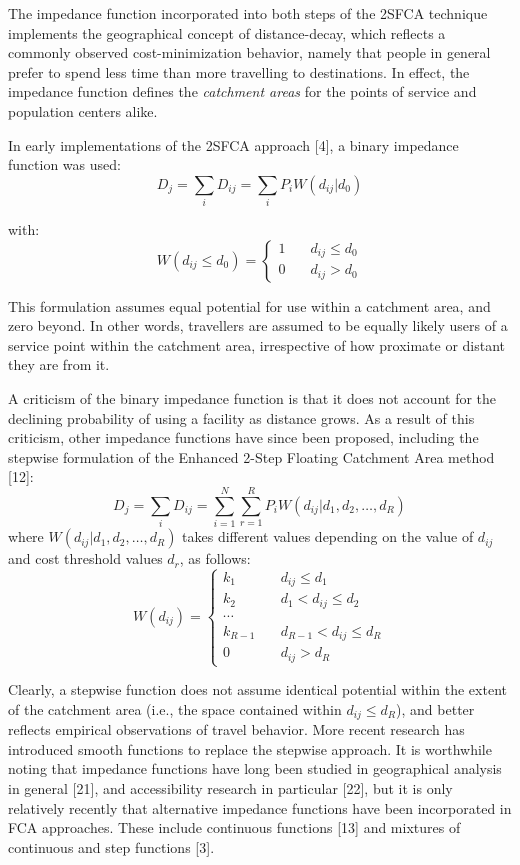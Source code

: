 \documentclass[10pt,letterpaper]{article}
\begin{document}
The impedance function incorporated into both steps of the 2SFCA
technique implements the geographical concept of distance-decay, which
reflects a commonly observed cost-minimization behavior, namely that
people in general prefer to spend less time than more travelling to
destinations. In effect, the impedance function defines the
\emph{catchment areas} for the points of service and population centers
alike.

In early implementations of the 2SFCA approach {[}4{]}, a binary
impedance function was used: \[
D_j = \sum_iD_{ij} = \sum_iP_iW(d_{ij}|d_0)
\]

with: \[
W(d_{ij}\leq d_0) = \left\{
        \begin{array}{ll}
            1 & \quad d_{ij} \leq d_0 \\
            0 & \quad d_{ij} > d_0
        \end{array}
    \right.
\]

This formulation assumes equal potential for use within a catchment
area, and zero beyond. In other words, travellers are assumed to be
equally likely users of a service point within the catchment area,
irrespective of how proximate or distant they are from it.

A criticism of the binary impedance function is that it does not account
for the declining probability of using a facility as distance grows. As
a result of this criticism, other impedance functions have since been
proposed, including the stepwise formulation of the Enhanced 2-Step
Floating Catchment Area method {[}12{]}: \[
D_j = \sum_iD_{ij} = \sum_{i=1}^N\sum_{r=1}^R P_iW(d_{ij}|d_1, d_2, \dots, d_R)
\] where \(W(d_{ij}|d_1, d_2, \dots, d_R)\) takes different values
depending on the value of \(d_{ij}\) and cost threshold values \(d_r\),
as follows: \[
W(d_{ij}) = \left\{
        \begin{array}{ll}
            k_1 & \quad d_{ij} \leq d_1 \\
            k_2 & \quad d_1 < d_{ij} \leq d_2 \\
            \dotsb \\
            k_{R-1} & \quad d_{R-1} < d_{ij} \leq d_R \\
            0 & \quad d_{ij} > d_R
        \end{array}
    \right.
\]

Clearly, a stepwise function does not assume identical potential within
the extent of the catchment area (i.e., the space contained within
\(d_{ij} \leq d_R\)), and better reflects empirical observations of
travel behavior. More recent research has introduced smooth functions to
replace the stepwise approach. It is worthwhile noting that impedance
functions have long been studied in geographical analysis in general
{[}21{]}, and accessibility research in particular {[}22{]}, but it is
only relatively recently that alternative impedance functions have been
incorporated in FCA approaches. These include continuous functions
{[}13{]} and mixtures of continuous and step functions {[}3{]}.
\end{document}
